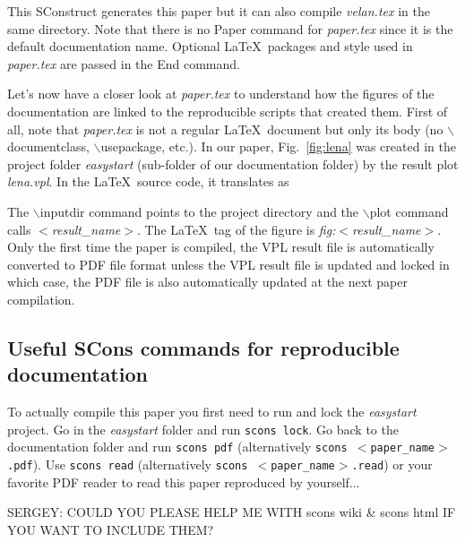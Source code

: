 

This SConstruct generates this paper but it can also compile
\textit{velan.tex} in the same directory. Note that there is no Paper
command for \textit{paper.tex} since it is the default documentation
name. Optional \LaTeX\ packages and style used in \textit{paper.tex}
are passed in the End command.

Let's now have a closer look at \textit{paper.tex} to understand how
the figures of the documentation are linked to the reproducible
scripts that created them. First of all, note that \textit{paper.tex}
is not a regular \LaTeX\ document but only its body (no
$\backslash$documentclass, $\backslash$usepackage, etc.). In our
paper, Fig.~\ref{fig:lena} was created in the project folder
\textit{easystart} (sub-folder of our documentation folder) by the
result plot \textit{lena.vpl}. In the \LaTeX\ source code, it
translates as\\



The $\backslash$inputdir command points to the project directory and
the $\backslash$plot command calls \textit{$<$result\_name$>$}. The
\LaTeX\ tag of the figure is \textit{fig:$<$result\_name$>$}. Only the
first time the paper is compiled, the VPL result file is automatically
converted to PDF file format unless the VPL result file is updated and
locked in which case, the PDF file is also automatically updated at
the next paper compilation.

\subsection{Useful SCons commands for reproducible documentation}

To actually compile this paper you first need to run and lock the
\textit{easystart} project. Go in the \textit{easystart} folder and
run \texttt{scons lock}. Go back to the documentation folder and run
\texttt{scons pdf} (alternatively \texttt{scons
  $<$paper\_name$>$.pdf}). Use \texttt{scons read} (alternatively
\texttt{scons $<$paper\_name$>$.read}) or your favorite PDF reader to
read this paper reproduced by yourself...

SERGEY: COULD YOU PLEASE HELP ME WITH scons wiki \& scons html IF YOU
WANT TO INCLUDE THEM?





